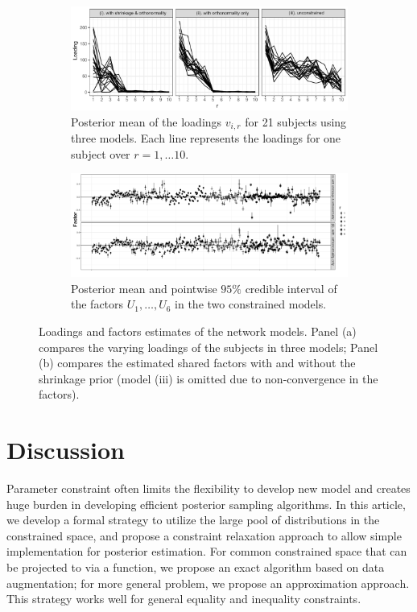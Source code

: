 \documentclass[10pt,fleqn]{article}
\DeclareMathOperator{\1}{\mathbbm{1}}
\begin{document}
\begin{figure}[H]
\centering
\begin{subfigure}[b]{0.8\textwidth}
\includegraphics[width=1\textwidth]{network_loading}
\caption{Posterior mean of the loadings $v_{i,r}$ for 21 subjects using three
models. Each line represents the loadings for one subject over $r=1,\ldots10$.}
\end{subfigure}
\begin{subfigure}[b]{1\textwidth}
\includegraphics[width=1\textwidth]{network_factor.pdf}
\caption{Posterior mean and pointwise $95\%$ credible interval of  the factors
$U_1,\ldots,
U_6$ in the two constrained models. }
\end{subfigure}
\caption{Loadings and factors estimates of the network models. Panel (a) compares
the varying loadings of the subjects in three models; Panel (b) compares
the estimated shared factors with and without the shrinkage prior (model (iii) is omitted due to non-convergence in the factors). \label{network_model_basis}}
\end{figure}




\section{Discussion}

Parameter constraint often limits the flexibility to develop new model and creates huge burden in developing efficient posterior sampling algorithms. In this article, we develop a formal strategy to utilize the large pool of distributions in the constrained space, and propose a constraint relaxation approach to allow simple implementation for posterior estimation. For common constrained space that can be projected to via a function, we propose an exact algorithm based on data augmentation; for more general problem, we propose an approximation approach.
This strategy works well for general equality and inequality constraints.
\end{document}
